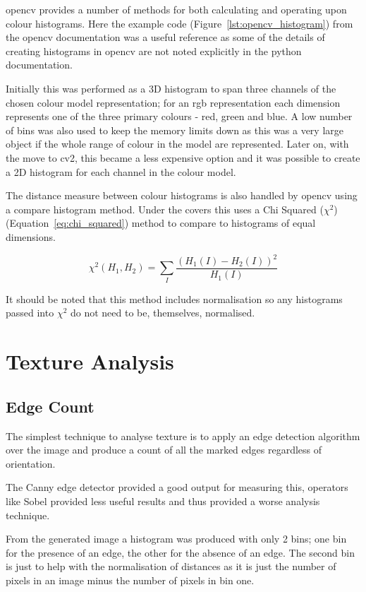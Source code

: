 \gls{opencv} provides a number of methods for both calculating and operating upon colour histograms. 
Here the example code (Figure~\ref{lst:opencv_histogram}) from the \gls{opencv} documentation was a
useful reference as some of the details of creating histograms in \gls{opencv} are not noted explicitly
in the python documentation.

Initially this was performed as a 3D histogram to span three channels of the chosen colour model 
representation; for an \gls{rgb} representation each dimension represents one of the three primary
colours - red, green and blue. A low number of bins was also used to keep the memory limits down
as this was a very large object if the whole range of colour in the model are represented.
Later on, with the move to \gls{cv2}, this became a less expensive option and it was possible to
create a 2D histogram for each channel in the colour model.

The distance measure between colour histograms is also handled by \gls{opencv} using a compare histogram
method. Under the covers this uses a Chi Squared ($\chi^2$) (Equation~\ref{eq:chi_squared}) method to
compare to histograms of equal dimensions.

\begin{equation}\label{eq:chi_squared}
\chi^2(H_1,H_2) =\sum_I{\frac{(H_1(I) - H_2(I))^2}{H_1(I)}}
\end{equation}

It should be noted that this method includes normalisation so any histograms passed into $\chi^2$
do not need to be, themselves, normalised.


\section{Texture Analysis}

\subsection{Edge Count}
The simplest technique to analyse texture is to apply an edge detection algorithm over the image
and produce a count of all the marked edges regardless of orientation.

The Canny edge detector\cite{Canny1986Computational} provided a good output for measuring this, 
operators like Sobel provided less useful results and thus provided a worse analysis technique.

From the generated image a histogram was produced with only 2 bins; one bin for the presence of an
edge, the other for the absence of an edge. The second bin is just to help with the normalisation
of distances as it is just the number of pixels in an image minus the number of pixels in bin one.

